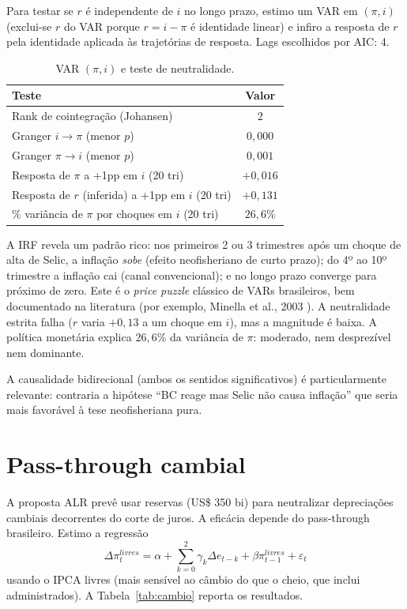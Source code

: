 \documentclass[11pt,a4paper]{article}
\begin{document}
Para testar se $r$ é independente de $i$ no longo prazo, estimo um VAR
em $(\pi, i)$ (exclui-se $r$ do VAR porque $r = i - \pi$ é identidade
linear) e infiro a resposta de $r$ pela identidade aplicada às trajetórias
de resposta. Lags escolhidos por AIC: 4.

\begin{table}[H]
\centering
\small
\begin{tabular}{lc}
\toprule
Teste & Valor \\
\midrule
Rank de cointegração (Johansen) & 2 \\
Granger $i \to \pi$ (menor $p$) & $0{,}000$ \\
Granger $\pi \to i$ (menor $p$) & $0{,}001$ \\
Resposta de $\pi$ a +1pp em $i$ (20 tri) & $+0{,}016$ \\
Resposta de $r$ (inferida) a +1pp em $i$ (20 tri) & $+0{,}131$ \\
\% variância de $\pi$ por choques em $i$ (20 tri) & $26{,}6\%$ \\
\bottomrule
\end{tabular}
\caption{VAR $(\pi, i)$ e teste de neutralidade.}
\label{tab:neutro}
\end{table}

A IRF revela um padrão rico: nos primeiros 2 ou 3 trimestres após um
choque de alta de Selic, a inflação \emph{sobe} (efeito neofisheriano
de curto prazo); do 4º ao 10º trimestre a inflação cai (canal
convencional); e no longo prazo converge para próximo de zero. Este é o
\emph{price puzzle} clássico de VARs brasileiros, bem documentado na
literatura (por exemplo, Minella et al., 2003 \cite{minella2003}). A
neutralidade estrita falha ($r$ varia $+0{,}13$ a um choque em $i$),
mas a magnitude é baixa. A política monetária explica $26{,}6\%$ da
variância de $\pi$: moderado, nem desprezível nem dominante.

A causalidade bidirecional (ambos os sentidos significativos) é
particularmente relevante: contraria a hipótese ``BC reage mas Selic
não causa inflação'' que seria mais favorável à tese neofisheriana pura.

\section{Pass-through cambial}\label{sec:cambio}

A proposta ALR prevê usar reservas (US\$ 350 bi) para neutralizar
depreciações cambiais decorrentes do corte de juros. A eficácia depende
do pass-through brasileiro. Estimo a regressão
\[
\Delta \pi^{livres}_t = \alpha + \sum_{k=0}^{2} \gamma_k \Delta e_{t-k}
                       + \beta \pi^{livres}_{t-1} + \varepsilon_t
\]
usando o IPCA livres (mais sensível ao câmbio do que o cheio, que
inclui administrados). A Tabela~\ref{tab:cambio} reporta os resultados.
\end{document}
